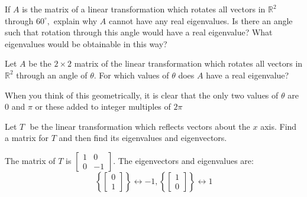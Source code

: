 \documentclass{ximera}
\begin{document}
\begin{problem}\label{prb:8.15} If $A$ is the matrix of a linear transformation which rotates all
vectors in $\mathbb{R}^{2}$ through $60^{\circ },$ explain why $A$ cannot
have any real eigenvalues. Is there an angle such that rotation through this
angle would have a real eigenvalue? What eigenvalues would be obtainable in
this way? \vspace{1mm}
\end{problem}


\begin{problem}\label{prb:8.16} Let $A$ be the $2\times 2$ matrix of the linear transformation which
rotates all vectors in $\mathbb{R}^{2}$ through an angle of $\theta $. For
which values of $\theta $ does $A$ have a real eigenvalue?
\begin{hint}
When you think of this geometrically, it is clear that the only two values
of $\theta $ are 0 and $\pi $ or these added to integer multiples of $2\pi $
\end{hint}
\end{problem}


\begin{problem}\label{prb:8.17} Let $T\,$\ be the linear transformation which reflects vectors about
the $x$ axis. Find a matrix for $T$ and then find its eigenvalues and
eigenvectors.
\begin{hint}
The matrix of $T$ is $\left[
\begin{array}{rr}
1 & 0 \\
0 & -1
\end{array}
\right]$. The eigenvectors and eigenvalues are:
\[
\left\{ \left[
\begin{array}{c}
0 \\
1
\end{array}
\right] \right\} \leftrightarrow -1,\left\{ \left[
\begin{array}{c}
1 \\
0
\end{array}
\right] \right\} \leftrightarrow 1
\]
\end{hint}
\end{problem}
\end{document}
